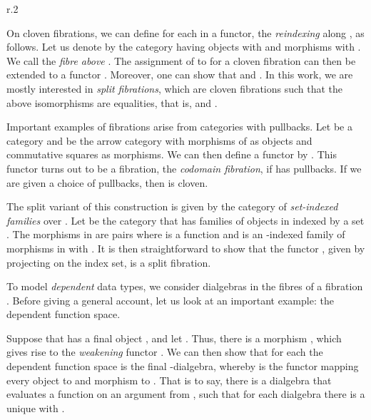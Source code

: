 \documentclass[preprint]{sigplanconf}
\begin{document}
\begin{wrapfigure}[7]{r}{.2\textwidth}
\vspace{-1.2\baselineskip}
\hspace*{-20pt}
\end{wrapfigure}

On cloven fibrations, we can define for each  in 
a functor, the \emph{reindexing} along , as follows.
Let us denote by  the category
having objects  with  and morphisms  with
.
We call  the \emph{fibre above }.
The assignment of  to  for a cloven fibration can then be
extended to a functor .
Moreover, one can show that  and
.
In this work, we are mostly interested in \emph{split fibrations},
which are cloven fibrations such that the above isomorphisms are
equalities, that is,  and
.

\begin{example}
  Important examples of fibrations arise from categories with pullbacks.
  Let  be a category and  be the arrow category with
  morphisms  of  as objects and commutative squares as
  morphisms.
  We can then define a functor  by
  .
  This functor turns out to be a fibration, the \emph{codomain fibration},
  if  has pullbacks.
  If we are given a choice of pullbacks, then  is cloven.

  The split variant of this construction is given by the category of
  \emph{set-indexed families} over .
  Let  be the category that has families 
  of objects  in  indexed by a set .
  The morphisms  in
   are pairs  where  is a function and 
  is an -indexed family of morphisms in  with
  .
  It is then straightforward to show that the functor
  , given by projecting on the index set,
  is a split fibration.
  \qedDef
\end{example}

To model \emph{dependent} data types, we consider dialgebras in the fibres of a
fibration .
Before giving a general account, let us look at an important example:
the dependent function space.
\begin{example}
  Suppose that  has a final object , and let .
  Thus, there is a morphism , which gives rise
  to the \emph{weakening} functor
  .
  We can then show that for each  the dependent function space
   is the final -dialgebra, whereby  is
  the functor mapping every object to  and morphism to .
  That is to say, there is a dialgebra 
  that evaluates a function on an argument from , such that for each
  dialgebra  there is a unique
   with .
  \qedDef
\end{example}
\end{document}
